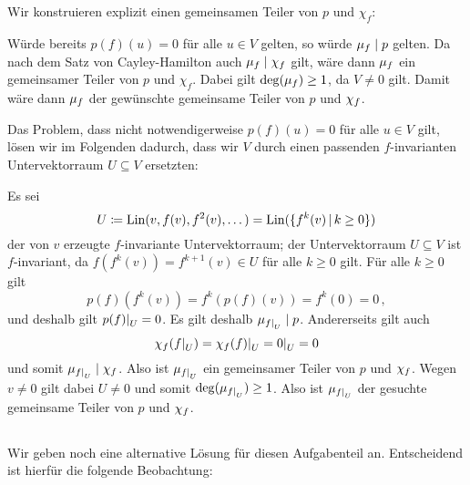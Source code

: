 \section{}





\subsection{}

Wir konstruieren explizit einen gemeinsamen Teiler von $p$ und $\chi_f$:

Würde bereits $p(f)(u) = 0$ für alle $u \in V$ gelten, so würde $\mu_{f} \mathrel{|} p$ gelten.
Da nach dem Satz von Cayley-Hamilton auch $\mu_{f} \mathrel{|} \chi_{f}$ gilt, wäre dann $\mu_{f}$ ein gemeinsamer Teiler von $p$ und $\chi_f$.
Dabei gilt $\deg(\mu_{f}) \geq 1$, da $V \neq 0$ gilt.
Damit wäre dann $\mu_{f}$ der gewünschte gemeinsame Teiler von $p$ und $\chi_{f}$.

Das Problem, dass nicht notwendigerweise $p(f)(u) = 0$ für alle $u \in V$ gilt, lösen wir im Folgenden dadurch, dass wir $V$ durch einen passenden $f$-invarianten Untervektorraum $U \subseteq V$ ersetzten:

Es sei
\[
            U
  \defined  \Lin(v, f(v), f^2(v), \dotsc)
  =         \Lin( \{ f^k(v) \suchthat k \geq 0 \} )
\]
der von $v$ erzeugte $f$-invariante Untervektorraum;
der Untervektorraum $U \subseteq V$ ist $f$-invariant, da $f(f^k(v)) = f^{k+1}(v) \in U$ für alle $k \geq 0$ gilt.
Für alle $k \geq 0$ gilt
\[
    p(f)( f^k(v) )
  = f^k( p(f)(v) )
  = f^k( 0 )
  = 0 \,,
\]
und deshalb gilt $\restrict{p(f)}{U} = 0$.
Es gilt deshalb $\minpol{\restrict{f}{U}} \divides p$.
Andererseits gilt auch
\[
    \charpol{f}(\restrict{f}{U})
  = \restrict{\charpol{f}(f)}{U}
  = \restrict{0}{U}
  = 0
\]
und somit $\minpol{\restrict{f}{U}} \divides \charpol{f}$.
Also ist $\minpol{\restrict{f}{U}}$ ein gemeinsamer Teiler von $p$ und $\chi_{f}$.
Wegen $v \neq 0$ gilt dabei $U \neq 0$ und somit $\deg( \minpol{\restrict{f}{U}} ) \geq 1$.
Also ist $\minpol{\restrict{f}{U}}$ der gesuchte gemeinsame Teiler von $p$ und $\chi_{f}$.





\subsection{}

Wir geben noch eine alternative Lösung für diesen Aufgabenteil an.
Entscheidend ist hierfür die folgende Beobachtung:

